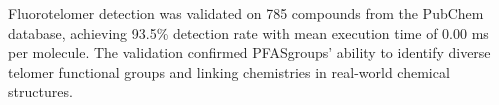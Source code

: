 
Fluorotelomer detection was validated on 785 compounds from the PubChem database, achieving 93.5\% detection rate with mean execution time of 0.00 ms per molecule. The validation confirmed PFASgroups' ability to identify diverse telomer functional groups and linking chemistries in real-world chemical structures.

